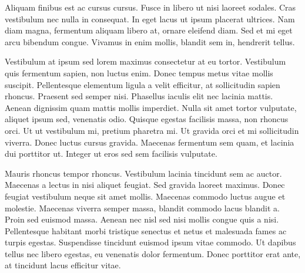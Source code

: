 		Aliquam finibus est ac cursus cursus. Fusce in libero ut nisi laoreet sodales. Cras vestibulum nec nulla in consequat. In eget lacus ut ipsum placerat ultrices. Nam diam magna, fermentum aliquam libero at, ornare eleifend diam. Sed et mi eget arcu bibendum congue. Vivamus in enim mollis, blandit sem in, hendrerit tellus.

		Vestibulum at ipsum sed lorem maximus consectetur at eu tortor. Vestibulum quis fermentum sapien, non luctus enim. Donec tempus metus vitae mollis suscipit. Pellentesque elementum ligula a velit efficitur, at sollicitudin sapien rhoncus. Praesent sed semper nisi. Phasellus iaculis elit nec lacinia mattis. Aenean dignissim quam mattis mollis imperdiet. Nulla sit amet tortor vulputate, aliquet ipsum sed, venenatis odio. Quisque egestas facilisis massa, non rhoncus orci. Ut ut vestibulum mi, pretium pharetra mi. Ut gravida orci et mi sollicitudin viverra. Donec luctus cursus gravida. Maecenas fermentum sem quam, et lacinia dui porttitor ut. Integer ut eros sed sem facilisis vulputate.

		Mauris rhoncus tempor rhoncus. Vestibulum lacinia tincidunt sem ac auctor. Maecenas a lectus in nisi aliquet feugiat. Sed gravida laoreet maximus. Donec feugiat vestibulum neque sit amet mollis. Maecenas commodo luctus augue et molestie. Maecenas viverra semper massa, blandit commodo lacus blandit a. Proin sed euismod massa. Aenean nec nisl sed nisi mollis congue quis a nisi. Pellentesque habitant morbi tristique senectus et netus et malesuada fames ac turpis egestas. Suspendisse tincidunt euismod ipsum vitae commodo. Ut dapibus tellus nec libero egestas, eu venenatis dolor fermentum. Donec porttitor erat ante, at tincidunt lacus efficitur vitae. 

